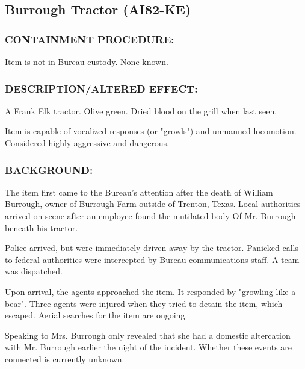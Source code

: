 \subsection*{Burrough Tractor (AI82-KE)}
\subsubsection*{CONTAINMENT PROCEDURE:}
\par Item is not in Bureau custody. None known.
\subsubsection*{DESCRIPTION/ALTERED EFFECT:}
\par A Frank Elk tractor. Olive green. Dried blood on the grill when last
seen.
\par Item is capable of vocalized responses (or "growls") and
unmanned locomotion. Considered highly aggressive and
dangerous.
\subsubsection*{BACKGROUND:}
\par The item first came to the Bureau's attention after the death of
William Burrough, owner of Burrough Farm outside of Trenton,
Texas. Local authorities arrived on scene after an employee found
the mutilated body Of Mr. Burrough beneath his tractor.
\par Police arrived, but were immediately driven away by the tractor.
Panicked calls to federal authorities were intercepted by Bureau
communications staff. A team was dispatched.
\par Upon arrival, the agents approached the item. It responded by
"growling like a bear". Three agents were injured when they tried
to detain the item, which escaped. Aerial searches for the item
are ongoing.
\par Speaking to Mrs. Burrough only revealed that she had a domestic
altercation with Mr. Burrough earlier the night of the incident.
Whether these events are connected is currently unknown.